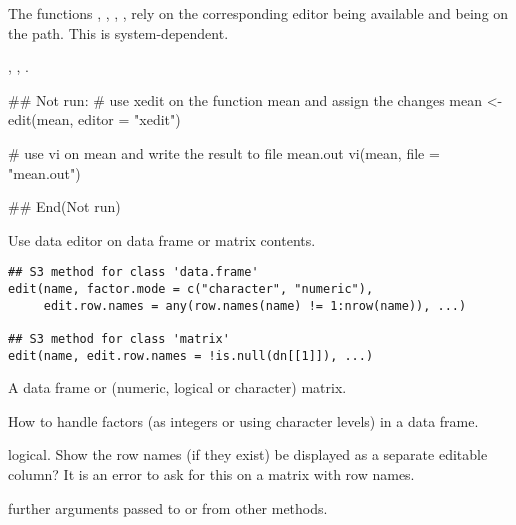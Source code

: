 %
\begin{Note}\relax
The functions , , , ,
 rely on the corresponding editor being available and
being on the path. This is system-dependent.
\end{Note}
%
\begin{SeeAlso}\relax
{},
,
.
\end{SeeAlso}
%
\begin{Examples}
\begin{ExampleCode}
## Not run: 
# use xedit on the function mean and assign the changes
mean <- edit(mean, editor = "xedit")

# use vi on mean and write the result to file mean.out
vi(mean, file = "mean.out")

## End(Not run)
\end{ExampleCode}
\end{Examples}
%
\begin{Description}\relax
Use data editor on data frame or matrix contents.
\end{Description}
%
\begin{Usage}
\begin{verbatim}
## S3 method for class 'data.frame'
edit(name, factor.mode = c("character", "numeric"),
     edit.row.names = any(row.names(name) != 1:nrow(name)), ...)

## S3 method for class 'matrix'
edit(name, edit.row.names = !is.null(dn[[1]]), ...)
\end{verbatim}
\end{Usage}
%
\begin{Arguments}
\begin{ldescription}
\item[\code{name}] A data frame or (numeric, logical or character) matrix.
\item[\code{factor.mode}] How to handle factors (as integers or using
character levels) in a data frame.
\item[\code{edit.row.names}] logical. Show the row names (if they exist) be
displayed as a separate editable column?  It is an error to ask for
this on a matrix with  row names.
\item[\code{...}] further arguments passed to or from other methods.
\end{ldescription}
\end{Arguments}
